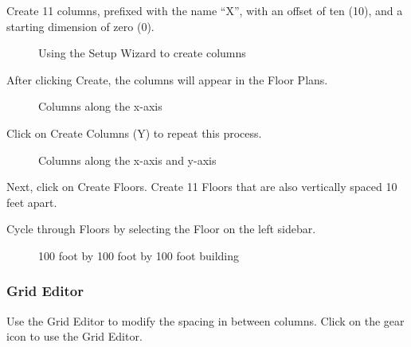 \documentclass[letterpaper,10pt,english]{sphinxmanual}
\begin{document}
Create 11 columns, prefixed with the name “X”, with an offset of ten (10), and a starting dimension of zero (0).

\begin{figure}[H]
\centering
\capstart

\noindent{}
\caption{Using the Setup Wizard to create columns}\label{\detokenize{docs/userguide/definingarchitecturalelements/floorplans/index-floor-plans:id2}}\end{figure}

After clicking Create, the columns will appear in the Floor Plans.

\begin{figure}[H]
\centering
\capstart

\noindent{}
\caption{Columns along the x-axis}\label{\detokenize{docs/userguide/definingarchitecturalelements/floorplans/index-floor-plans:id3}}\end{figure}

Click on Create Columns (Y) to repeat this process.

\begin{figure}[H]
\centering
\capstart

\noindent{}
\caption{Columns along the x-axis and y-axis}\label{\detokenize{docs/userguide/definingarchitecturalelements/floorplans/index-floor-plans:id4}}\end{figure}

Next, click on Create Floors.  Create 11 Floors that are also vertically spaced 10 feet apart.

Cycle through Floors by selecting the Floor on the left sidebar.

\begin{figure}[H]
\centering
\capstart

\noindent{}
\caption{100 foot by 100 foot by 100 foot building}\label{\detokenize{docs/userguide/definingarchitecturalelements/floorplans/index-floor-plans:id5}}\end{figure}


\subsubsection{Grid Editor}
\label{\detokenize{docs/userguide/definingarchitecturalelements/floorplans/index-floor-plans:grid-editor}}
Use the Grid Editor to modify the spacing in between columns.  Click on the gear icon to use the Grid Editor.
\end{document}
